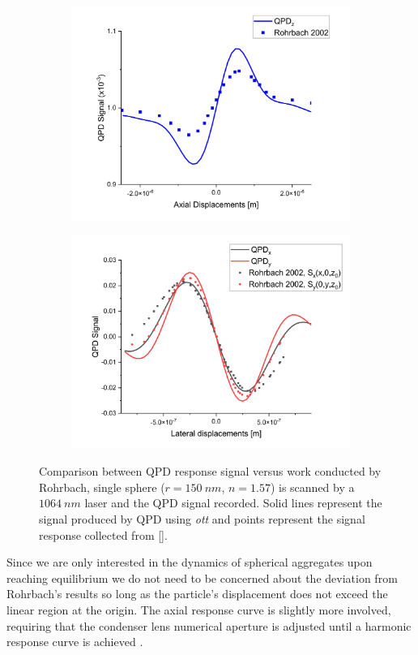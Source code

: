 \begin{figure}[h]
	\label{fig:Rohrbach}
	\begin{subfigure}{0.475 \linewidth}
		\subcaption{}
		\includegraphics[width=\linewidth]{QPD_axial_tests.png}
	\end{subfigure}
	\begin{subfigure}{0.475 \linewidth}
		\subcaption{}
		\includegraphics[width=\linewidth]{QPD_lat_tests.png}
	\end{subfigure}
	\caption{Comparison between QPD response signal versus work conducted by Rohrbach, single sphere ($r = 150\ nm$, $n=1.57$) is scanned by a $1064\ nm$ laser and the QPD signal recorded. Solid lines represent the signal produced by QPD using \textit{ott} and points represent the signal response collected from [].}
\end{figure}
Since we are only interested in the dynamics of spherical aggregates upon reaching equilibrium we do not need to be concerned about the deviation from Rohrbach's results so long as the particle's displacement does not exceed the linear region at the origin. The axial response curve is slightly more involved, requiring that the condenser lens numerical aperture is adjusted until a harmonic response curve is achieved \cite{Friedrich2012}. 

